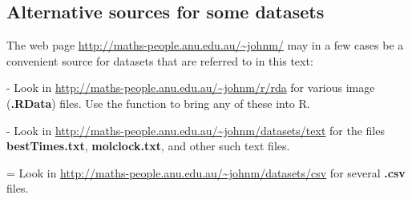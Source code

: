 \subsection*{Alternative sources for some datasets}
{\color{gray40}
The web page \url{http://maths-people.anu.edu.au/~johnm/} may in a few cases
be a convenient source for datasets that are referred to in this text:
\begin{itemizz}
\item[-] 
Look in \url{http://maths-people.anu.edu.au/~johnm/r/rda} for
  various image ({\bf .RData}) files.  Use the function  to bring any of these 
  into R.
\item[-] Look in \url{http://maths-people.anu.edu.au/~johnm/datasets/text}
  for the files {\bf bestTimes.txt}, {\bf molclock.txt}, and other such
  text files.
\item[=] Look in \url{http://maths-people.anu.edu.au/~johnm/datasets/csv}
  for several {\bf .csv} files.
\end{itemizz}
\vspace*{-9pt}
}

